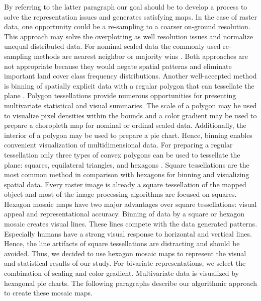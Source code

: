 		By referring to the latter paragraph our goal should be to develop a process to solve the representation issues and generates satisfying maps. In the case of raster data, one opportunity could be a re-sampling to a coarser on-ground resolution. This approach may solve the overplotting as well resolution issues and normalize unequal distributed data. For nominal scaled data the commonly used re-sampling methods are nearest neighbor or majority wins . Both approaches are not appropriate because they would negate spatial patterns and eliminate important land cover class frequency distributions. Another well-accepted method is binning of spatially explicit data with a regular polygon that can tessellate the plane \citep{Carr1992}. Polygon tessellations provide numerous opportunities for presenting multivariate statistical and visual summaries. The scale of a polygon may be used to visualize pixel densities within the bounds and a color gradient may be used to prepare a choropleth map for nominal or ordinal scaled data. Additionally, the interior of a polygon may be used to prepare a pie chart. Hence, binning enables convenient visualization of multidimensional data. For preparing a regular tessellation only three types of convex polygons can be used to tessellate the plane: squares, equilateral triangles, and hexagons \citep{Carr1992}. Square tessellations are the most common method in comparison with hexagons for binning and visualizing spatial data. Every raster image is already a square tessellation of the mapped object and most of the image processing algorithms are focused on squares. Hexagon mosaic maps have two major advantages over square tessellations: visual appeal and representational accuracy. Binning of data by a square or hexagon mosaic creates visual lines. These lines compete with the data generated patterns. Especially humans have a strong visual response to horizontal and vertical lines. Hence, the line artifacts of square tessellations are distracting and should be avoided. Thus, we decided to use hexagon mosaic maps to represent the visual and statistical results of our study. For bivariate representations, we select the combination of scaling and color gradient. Multivariate data is visualized by hexagonal pie charts. The following paragraphs describe our algorithmic approach to create these mosaic maps.

